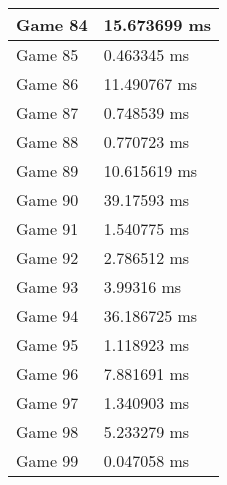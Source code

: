 \begin{tabular}{|l|l|}
	Game 84 & 15.673699 ms \\ \hline
	Game 85 & 0.463345 ms \\ \hline
	Game 86 & 11.490767 ms \\ \hline
	Game 87 & 0.748539 ms \\ \hline
	Game 88 & 0.770723 ms \\ \hline
	Game 89 & 10.615619 ms \\ \hline
	Game 90 & 39.17593 ms \\ \hline
	Game 91 & 1.540775 ms \\ \hline
	Game 92 & 2.786512 ms \\ \hline
	Game 93 & 3.99316 ms \\ \hline
	Game 94 & 36.186725 ms \\ \hline
	Game 95 & 1.118923 ms \\ \hline
	Game 96 & 7.881691 ms \\ \hline
	Game 97 & 1.340903 ms \\ \hline
	Game 98 & 5.233279 ms \\ \hline
	Game 99 & 0.047058 ms \\ \hline
\end{tabular}
